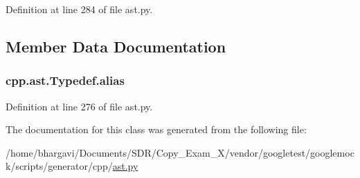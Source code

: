 Definition at line 284 of file ast.\+py.



\subsection{Member Data Documentation}
\subsubsection[{\texorpdfstring{alias}{alias}}]{\setlength{\rightskip}{0pt plus 5cm}cpp.\+ast.\+Typedef.\+alias}\hypertarget{classcpp_1_1ast_1_1_typedef_a3187a504dfbefe50b866b44902823c30}{}\label{classcpp_1_1ast_1_1_typedef_a3187a504dfbefe50b866b44902823c30}


Definition at line 276 of file ast.\+py.



The documentation for this class was generated from the following file\+:\begin{DoxyCompactItemize}
\item 
/home/bhargavi/\+Documents/\+S\+D\+R/\+Copy\+\_\+\+Exam\+\_\+X/vendor/googletest/googlemock/scripts/generator/cpp/\hyperlink{ast_8py}{ast.\+py}\end{DoxyCompactItemize}
